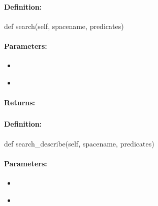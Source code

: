 \paragraph{Definition:}
\begin{pythoncode}
def search(self, spacename, predicates)
\end{pythoncode}

\paragraph{Parameters:}
\begin{itemize}[noitemsep]
\item {}\\

\item {}\\

\end{itemize}

\paragraph{Returns:}


\pagebreak
\subsubsection{}
\label{api:python:search_describe}


\paragraph{Definition:}
\begin{pythoncode}
def search_describe(self, spacename, predicates)
\end{pythoncode}

\paragraph{Parameters:}
\begin{itemize}[noitemsep]
\item {}\\

\item {}\\

\end{itemize}

